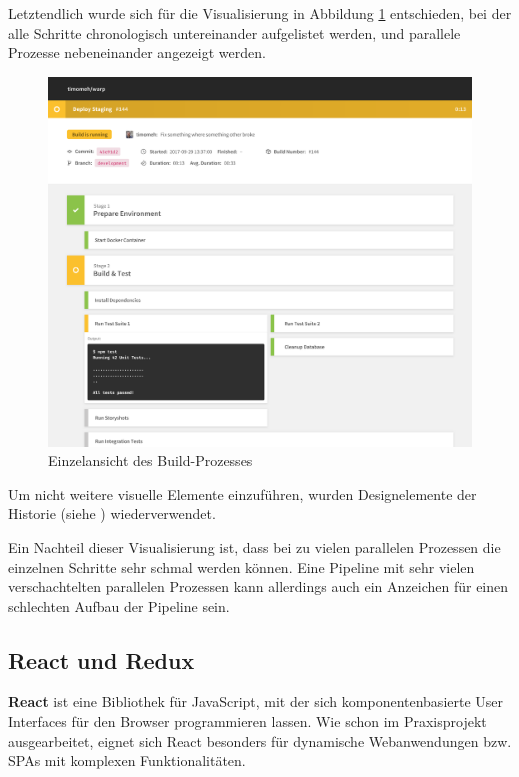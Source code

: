 Letztendlich wurde sich für die Visualisierung in Abbildung \ref{fig:pipeline-overview} entschieden, bei der alle Schritte chronologisch untereinander aufgelistet werden, und parallele Prozesse nebeneinander angezeigt werden.

\begin{figure}[h]
  \caption{Einzelansicht des Build-Prozesses}
  \label{fig:pipeline-overview}
  \centering
    \includegraphics[width=\textwidth]{assets/pipeline-overview}
\end{figure}

Um nicht weitere visuelle Elemente einzuführen, wurden Designelemente der Historie (siehe ) wiederverwendet.

Ein Nachteil dieser Visualisierung ist, dass bei zu vielen parallelen Prozessen die einzelnen Schritte sehr schmal werden können. Eine Pipeline mit sehr vielen verschachtelten parallelen Prozessen kann allerdings auch ein Anzeichen für einen schlechten Aufbau der Pipeline sein.

\subsection{React und Redux}
\label{subsec:react-redux}

\textbf{React} ist eine Bibliothek für JavaScript, mit der sich komponentenbasierte User Interfaces für den Browser programmieren lassen. Wie schon im Praxisprojekt \cite{Maemecke2017} ausgearbeitet, eignet sich React besonders für dynamische Webanwendungen bzw. \acp{SPA} mit komplexen Funktionalitäten.

